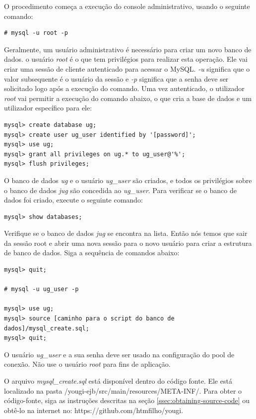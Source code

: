 \documentclass[envcountsame,envcountchap,letterpaper]{svmono}
\begin{document}
O procedimento começa a execução do console administrativo, usando o seguinte comando:

\begin{verbatim}
# mysql -u root -p
\end{verbatim}

Geralmente, um usuário administrativo é necessário para criar um novo banco de dados. o usuário \textit{root} é o que tem privilégios para realizar esta operação. Ele vai criar uma sessão de cliente autenticado para acessar o MySQL. \textit{-u} significa que o valor subsequente é o usuário da sessão e \textit{-p} significa que a senha deve ser solicitado logo após a execução do comando. Uma vez autenticado, o utilizador \textit{root} vai permitir a execução do comando abaixo, o que cria a base de dados e um utilizador específico para ele:

\begin{verbatim}
mysql> create database ug;
mysql> create user ug_user identified by '[password]';
mysql> use ug;
mysql> grant all privileges on ug.* to ug_user@'%';
mysql> flush privileges;
\end{verbatim}

O banco de dados \textit{ug} e o usuário \textit{ug\_user} são criados, e todos os privilégios sobre o banco de dados \textit{jug} são concedida ao \textit{ug\_user}. Para verificar se o banco de dados foi criado, execute o seguinte comando:

\begin{verbatim}
mysql> show databases;
\end{verbatim}

Verifique se o banco de dados \textit{jug} se encontra na lista. Então nós temos que sair da sessão root e abrir uma nova sessão para o novo usuário para criar a estrutura de banco de dados. Siga a sequência de comandos abaixo:

\begin{verbatim}
mysql> quit;

# mysql -u ug_user -p

mysql> use ug;
mysql> source [caminho para o script do banco de dados]/mysql_create.sql;
mysql> quit;
\end{verbatim}

O usuário \textit{ug\_user} e a sua senha deve ser usado na configuração do pool de conexão. Não use o usuário \textit{root} para fins de aplicação.

O arquivo \textit{mysql\_create.sql} está disponível dentro do código fonte. Ele está localizado na pasta /yougi-ejb/src/main/resources/META-INF/. Para obter o código-fonte, siga as instruções descritas na seção \ref{ssec:obtaining-source-code} ou obtê-lo na internet no: https://github.com/htmfilho/yougi.
\end{document}
